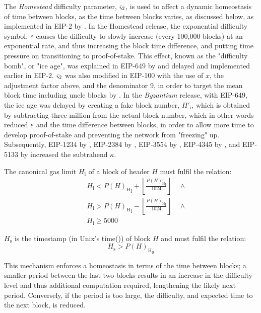 \documentclass[9pt,oneside]{amsart}
\begin{document}
\begin{multicols}{2}
The \textit{Homestead} difficulty parameter, $\varsigma_2$, is used to affect a dynamic homeostasis of time between blocks, as the time between blocks varies, as discussed below, as implemented in EIP-2 by \cite{EIP-2}.
In the Homestead release, the exponential difficulty symbol, $\epsilon$ causes the difficulty to slowly increase (every 100,000 blocks) at an exponential rate, and thus increasing the block time difference, and putting time pressure on transitioning to proof-of-stake.
This effect, known as the "difficulty bomb", or "ice age", was explained in EIP-649 by \cite{EIP-649} and delayed and implemented earlier in EIP-2.
$\varsigma_2$ was also modified in EIP-100 with the use of $x$, the adjustment factor above, and the denominator 9, in order to target the mean block time including uncle blocks by \cite{EIP-100}.
In the \textit{Byzantium} release, with EIP-649, the ice age was delayed by creating a fake block number, $H'_{\mathrm{i}}$, which is obtained by subtracting three million from the actual block number,
which in other words reduced $\epsilon$ and the time difference between blocks, in order to allow more time to develop proof-of-stake and preventing the network from "freezing" up.
Subsequently, EIP-1234 by \cite{EIP-1234}, EIP-2384 by \cite{EIP-2384}, EIP-3554 by \cite{EIP-3554}, EIP-4345 by \cite{EIP-4345}, and EIP-5133 by \cite{EIP-5133} increased the subtrahend $\kappa$.

\hypertarget{block_gas_limit_H__l}{}The canonical gas limit $H_{\mathrm{l}}$ of a block of header $H$ must fulfil the relation:
\begin{eqnarray}
& & H_{\mathrm{l}} < {P(H)_{\mathrm{H}}}_{\mathrm{l}} + \left\lfloor\frac{{P(H)_{\mathrm{H}}}_{\mathrm{l}}}{1024}\right\rfloor \quad \wedge \\
\nonumber& & H_{\mathrm{l}} > {P(H)_{\mathrm{H}}}_{\mathrm{l}} - \left\lfloor\frac{{P(H)_{\mathrm{H}}}_{\mathrm{l}}}{1024}\right\rfloor \quad \wedge \\
\nonumber& & H_{\mathrm{l}} \geqslant 5000
\end{eqnarray}

\hypertarget{block_timestamp_H__s}{}$H_{\mathrm{s}}$ is the timestamp (in Unix's time()) of block $H$ and must fulfil the relation:
\begin{equation}
H_{\mathrm{s}} > {P(H)_{\mathrm{H}}}_{\mathrm{s}}
\end{equation}

This mechanism enforces a homeostasis in terms of the time between blocks; a smaller period between the last two blocks results in an increase in the difficulty level and thus additional computation required, lengthening the likely next period. Conversely, if the period is too large, the difficulty, and expected time to the next block, is reduced.


\end{multicols}
\end{document}
